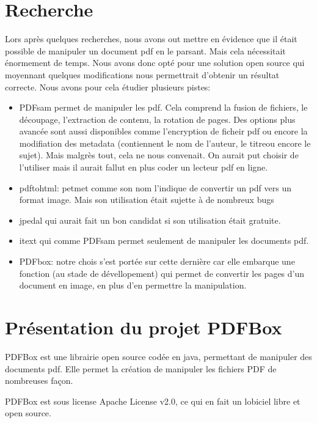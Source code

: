    \section{Recherche}
    Lors après quelques recherches, nous avons out mettre en évidence que il était 
    possible de manipuler un document pdf en le parsant. Mais cela nécessitait 
    énormement de temps. Nous avons donc opté pour une solution open source
    qui moyennant quelques modifications nous permettrait d'obtenir un résultat
    correcte.
    Nous avons pour cela étudier plusieurs pistes:
    \begin{itemize}
    \item PDFsam permet de manipuler les pdf. Cela comprend la fusion de 
     fichiers, le découpage, l'extraction de contenu, la rotation de pages.
     Des options plus avancée sont aussi disponibles comme l'encryption de ficheir
     pdf ou encore  la modifiation des metadata (contiennent le nom de l'auteur,
     le titreou encore le sujet). Mais malgrès tout, cela ne nous convenait.
     On aurait put choisir de l'utiliser mais il aurait fallut en plus coder un lecteur 
     pdf en ligne.
     \item pdftohtml: petmet comme son nom l'indique de convertir un pdf 
     vers un format image. Mais son utilisation était sujette à de nombreux bugs
     \item jpedal qui aurait fait un bon candidat si son utilisation était gratuite.
     \item itext qui comme PDFsam permet seulement de manipuler les 
     documents pdf.
     \item PDFbox: notre chois s'est portée sur cette dernière car elle embarque une 
     fonction (au stade de dévellopement) qui permet de convertir les pages d'un
     document en image, en plus d'en permettre la manipulation.
    \end{itemize}

    \section{Présentation du projet PDFBox}
    PDFBox est une librairie open source codée en java, permettant de manipuler 
    des documents pdf. Elle permet la création de manipuler les fichiers PDF de 
    nombreuses façon.

    PDFBox est sous license Apache License v2.0, ce qui en fait un lobiciel libre 
    et open source.

